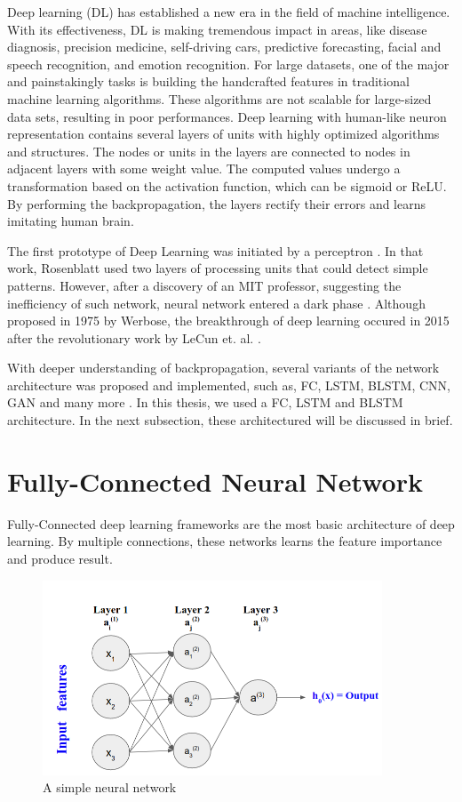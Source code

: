 Deep learning (DL) has established a new era in the field of machine intelligence. With its effectiveness, DL is making tremendous impact  in areas, like disease diagnosis, precision medicine, self-driving cars, predictive forecasting, facial and speech recognition, and emotion recognition. For large datasets, one of the major and painstakingly tasks is building the handcrafted features in traditional machine learning algorithms. These algorithms are not scalable for large-sized data sets, resulting in poor performances.  Deep learning with human-like neuron representation contains several layers of units with highly optimized algorithms and structures. The nodes or units in the layers are connected to nodes in adjacent layers with some weight value. The computed values undergo a transformation based on the activation function, which can be sigmoid or ReLU. By performing the backpropagation, the layers rectify their errors and learns imitating human brain. 

The first prototype of Deep Learning was initiated by a perceptron \cite{Rosenblatt1958ThePA}. In that work, Rosenblatt used two layers of processing units that could detect simple patterns. However,  after a discovery of an MIT professor, suggesting the inefficiency of such network, neural network entered a dark phase \cite{Minsky1969PerceptronsA}.  Although proposed in 1975 by Werbose, the breakthrough of deep learning occured in 2015 after the revolutionary work by LeCun et. al. \cite{Deep_LEarning}.  

With deeper understanding of backpropagation, several variants of the network architecture was proposed and implemented, such as, FC, LSTM, BLSTM, CNN, GAN and many more \cite{g1,g2,g3,g4}. In this thesis, we used a FC, LSTM and BLSTM architecture. In the next subsection, these architectured will be discussed in brief. 

\section{Fully-Connected Neural Network}
\label{FC-DNN}

Fully-Connected deep learning frameworks are the most basic architecture of deep learning. By multiple connections, these networks learns the feature importance and produce result. 
\begin{figure}
\centering
   \includegraphics[width=0.9\textwidth]{Chapters/simple_NN.png}
\caption[A simple neural network]{A simple neural network }
\label{fig:simple_NN}
\end{figure}

